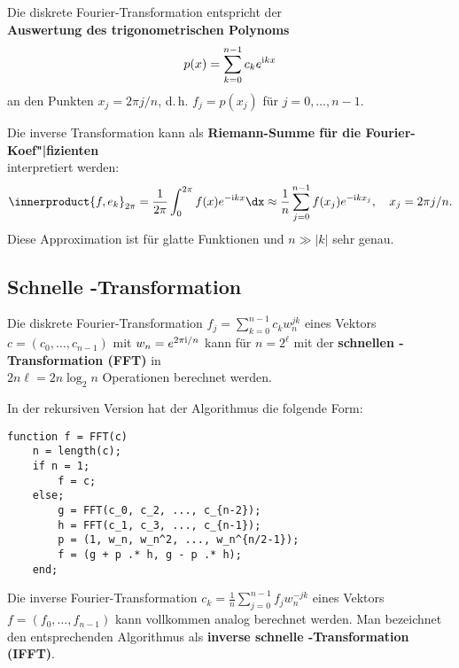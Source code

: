 \linie

Die diskrete Fourier-Transformation entspricht der \\
\textbf{Auswertung des trigonometrischen Polynoms}
\begin{align*}
    p(x) = \sum_{k=0}^{n-1} c_k e^{\mathrm{i} k x}
\end{align*}
an den Punkten $x_j = 2 \pi j / n$, d.\,h. $f_j = p(x_j)$ für
$j = 0, \dotsc, n - 1$.

\linie

Die inverse Transformation kann als
\textbf{Riemann-Summe für die Fourier-Koef"|fizienten} \\
interpretiert werden:
\begin{align*}
    \innerproduct{f, e_k}_{2\pi} = \frac{1}{2\pi} \int_0^{2\pi} f(x) e^{-\i k x} \dx
    \approx \frac{1}{n} \sum_{j=0}^{n-1} f(x_j) e^{-\i k x_j}, \quad
    x_j = 2 \pi j / n.
\end{align*}
Diese Approximation ist für glatte Funktionen und $n \gg |k|$ sehr genau.

\subsection{%
    Schnelle -Transformation%
}

Die diskrete Fourier-Transformation $f_j = \sum_{k=0}^{n-1} c_k w_n^{jk}$
eines Vektors $c = (c_0, \dotsc, c_{n-1})$ mit $w_n = e^{2\pi\mathrm{i}/n}$
kann für $n = 2^\ell$ mit der
\textbf{schnellen -Transformation (FFT)} in \\
$2n\ell = 2 n \log_2 n$ Operationen berechnet werden.

In der rekursiven Version hat der Algorithmus die folgende Form:
\begin{lstlisting}
function f = FFT(c)
    n = length(c);
    if n = 1;
        f = c;
    else;
        g = FFT(c_0, c_2, ..., c_{n-2});
        h = FFT(c_1, c_3, ..., c_{n-1});
        p = (1, w_n, w_n^2, ..., w_n^{n/2-1});
        f = (g + p .* h, g - p .* h);
    end;
\end{lstlisting}

\linie
\pagebreak

Die inverse Fourier-Transformation
$c_k = \frac{1}{n} \sum_{j=0}^{n-1} f_j w_n^{-jk}$
eines Vektors $f = (f_0, \dotsc, f_{n-1})$
kann vollkommen analog berechnet werden.
Man bezeichnet den entsprechenden Algorithmus als
\textbf{inverse schnelle -Transformation (IFFT)}.

\linie

